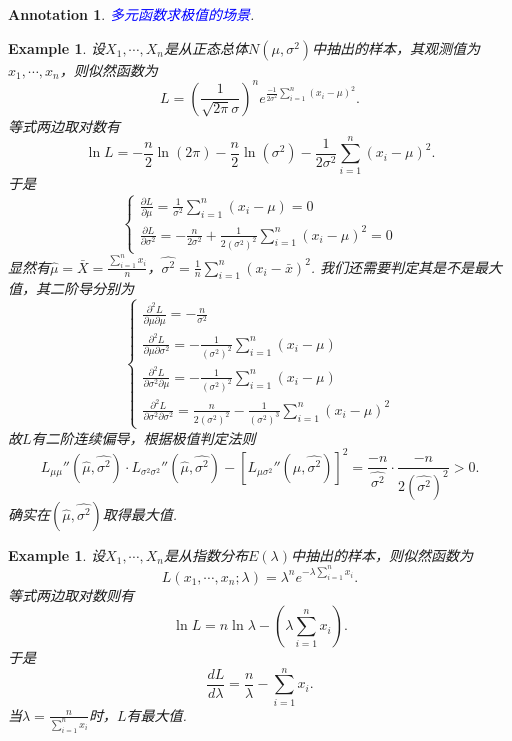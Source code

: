 \documentclass{article}
\newtheorem{example}[theorem]{Example}
\newtheorem{annotation}[theorem]{Annotation}
\newcommand{\bluet}[1]{\textcolor{blue}{#1}}
\begin{document}
\begin{annotation}
\rm \bluet{多元函数求极值的场景}.
\end{annotation}

\begin{example}
\rm 设$X_1,\cdots,X_n$是从正态总体$N(\mu,\sigma^2)$中抽出的样本，其观测值为$x_1,\cdots,x_n$，则似然函数为
$$
L = \left(\frac{1}{\sqrt{2\pi}\sigma}\right)^ne^{\frac{-1}{2\sigma^2}\sum\limits_{i =1}^n (x_i-\mu)^2}.
$$
等式两边取对数有
$$
\ln L =-\frac{n}{2}\ln(2\pi)-\frac{n}{2}\ln(\sigma^2) - \frac{1}{2\sigma^2}\sum\limits_{i =1}^n (x_i-\mu)^2.
$$
于是
$$
\left\{
\begin{array}{ll}
\frac{\partial L}{\partial \mu} = \frac{1}{\sigma^2}\sum\limits_{i =1}^n (x_i-\mu) = 0 \\
\frac{\partial L}{\partial \sigma^2} = - \frac{n}{2\sigma^2} +\frac{1}{2(\sigma^2)^2} \sum\limits_{i =1}^n (x_i-\mu)^2 = 0
\end{array}\right.
$$
显然有$\widehat{\mu} = \bar{X} = \frac{\sum\limits_{i =1}^n x_i}{n}$，$\widehat{\sigma^2} = \frac{1}{n}\sum\limits_{i =1}^n (x_i-\bar{x})^2$. 我们还需要判定其是不是最大值，其二阶导分别为
$$
\left\{
\begin{array}{ll}
\frac{\partial^2L}{\partial \mu\partial \mu} = -\frac{n}{\sigma^2} \\
\frac{\partial^2L}{\partial \mu \partial \sigma^2} =  -\frac{1}{(\sigma^2)^2}\sum\limits_{i =1}^n (x_i-\mu) \\
\frac{\partial^2L}{\partial \sigma^2 \partial \mu} = -\frac{1}{(\sigma^2)^2}\sum\limits_{i =1}^n (x_i-\mu) \\
\frac{\partial^2L}{\partial \sigma^2 \partial \sigma^2} =  \frac{n}{2(\sigma^2)^2} - \frac{1}{(\sigma^2)^3}\sum\limits_{i =1}^n (x_i-\mu)^2
\end{array}\right.
$$
故$L$有二阶连续偏导，根据极值判定法则
$$
L_{\mu\mu}''(\widehat{\mu},\widehat{\sigma^2})\cdot L_{\sigma^2\sigma^2}''(\widehat{\mu},\widehat{\sigma^2}) - \left[L_{\mu\sigma^2}''(\widehat{\mu},\widehat{\sigma^2})\right]^2 = \frac{-n}{\widehat{\sigma^2}}\cdot\frac{-n}{2(\widehat{\sigma^2})^2} > 0.
$$
确实在$(\widehat{\mu},\widehat{\sigma^2})$取得最大值.
\end{example}

\begin{example}
\rm 设$X_1,\cdots,X_n$是从指数分布$E(\lambda)$中抽出的样本，则似然函数为
$$
L(x_1,\cdots,x_n;\lambda) = \lambda^n e^{-\lambda\sum\limits_{i=1}^{n} x_i}. 
$$
等式两边取对数则有
$$
\ln L = n\ln\lambda - \left(\lambda\sum\limits_{i=1}^{n} x_i\right). 
$$
于是
$$
\frac{dL}{d\lambda} = \frac{n}{\lambda} - \sum\limits_{i=1}^{n} x_i. 
$$
当$\lambda = \frac{n}{\sum\limits_{i=1}^{n} x_i}$时，$L$有最大值. 
\end{example}
\end{document}

